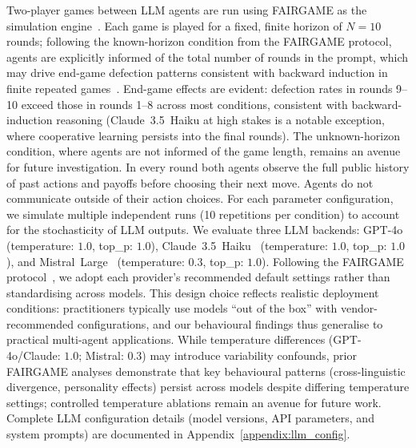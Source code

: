 \documentclass[a4paper,fleqn]{cas-sc}
\begin{document}
Two-player games between LLM agents are run using FAIRGAME as the simulation engine~\cite{buscemi2025fairgame}. Each game is played for a fixed, finite horizon of $N = 10$ rounds; following the known-horizon condition from the FAIRGAME protocol, agents are explicitly informed of the total number of rounds in the prompt, which may drive end-game defection patterns consistent with backward induction in finite repeated games~\cite{sigmund:2010bo}. End-game effects are evident: defection rates in rounds 9--10 exceed those in rounds 1--8 across most conditions, consistent with backward-induction reasoning (Claude~3.5~Haiku at high stakes is a notable exception, where cooperative learning persists into the final rounds). The unknown-horizon condition, where agents are not informed of the game length, remains an avenue for future investigation. In every round both agents observe the full public history of past actions and payoffs before choosing their next move. Agents do not communicate outside of their action choices. For each parameter configuration, we simulate multiple independent runs (10 repetitions per condition) to account for the stochasticity of LLM outputs. We evaluate three LLM backends: GPT-4o~\cite{gpt4o} (temperature: $1.0$, top\_p: $1.0$), Claude~3.5~Haiku~\cite{claude3} (temperature: $1.0$, top\_p: $1.0$), and Mistral~Large~\cite{mistral} (temperature: $0.3$, top\_p: $1.0$). Following the FAIRGAME protocol~\cite{buscemi2025fairgame}, we adopt each provider's recommended default settings rather than standardising across models. This design choice reflects realistic deployment conditions: practitioners typically use models ``out of the box'' with vendor-recommended configurations, and our behavioural findings thus generalise to practical multi-agent applications. While temperature differences (GPT-4o/Claude: $1.0$; Mistral: $0.3$) may introduce variability confounds, prior FAIRGAME analyses demonstrate that key behavioural patterns (cross-linguistic divergence, personality effects) persist across models despite differing temperature settings; controlled temperature ablations remain an avenue for future work. Complete LLM configuration details (model versions, API parameters, and system prompts) are documented in Appendix~\ref{appendix:llm_config}.
\end{document}
